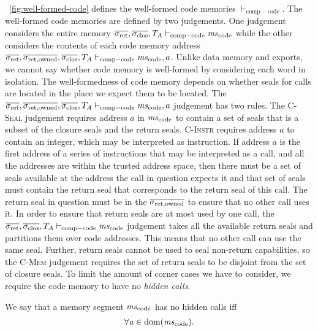 \documentclass[acmsmall,screen]{acmart}\settopmatter{}
\newenvironment{jversion}%
    {\color{OliveGreen}}{}
\begin{document}
\begin{jversion}
\figurename~\ref{fig:well-formed-code} defines the well-formed code memories $\vdash_{\mathrm{comp-code}}$.
The well-formed code memories are defined by two judgements.
One judgement considers the entire memory $\sigrets,\sigcloss,\ta\vdash_{\mathrm{comp-code}} \mscode$ while the other considers the contents of each code memory address $\sigrets,\sigrets[\mathrm{owned}],\sigcloss,\ta \vdash_{\mathrm{comp-code}} \mscode,a$.
Unlike data memory and exports, we cannot say whether code memory is well-formed by considering each word in isolation.
The well-formedness of code memory depends on whether seals for calls are located in the place we expect them to be located.
The $\sigrets,\sigrets[\mathrm{owned}],\sigcloss,\ta \vdash_{\mathrm{comp-code}} \mscode,a$ judgement has two rules.
The \textsc{C-Seal} judgement requires address $a$ in $\mscode$ to contain a set of seals that is a subset of the closure seals and the return seals.
\textsc{C-Instr} requires address $a$ to contain an integer, which may be interpreted as instruction.
If address $a$ is the first address of a series of instructions that may be interpreted as a call, and all the addresses are within the trusted address space, then there must be a set of seals available at the address the call in question expects it and that set of seals must contain the return seal that corresponds to the return seal of this call.
The return seal in question must be in the $\sigrets[\mathrm{owned}]$ to ensure that no other call uses it.
In order to ensure that return seals are at most used by one call, the $\sigrets,\sigcloss,\ta\vdash_{\mathrm{comp-code}} \mscode$ judgement takes all the available return seals and partitions them over code addresses. 
This means that no other call can use the same seal.
Further, return seals cannot be used to seal non-return capabilities, so the \textsc{C-Mem} judgement requires the set of return seals to be disjoint from the set of closure seals.
To limit the amount of corner cases we have to consider, we require the code memory to have no \textit{hidden calls}.
\begin{definition}
  \label{def:no-hidden-calls}
  We say that a memory segment $\mscode$ has no hidden calls iff
  \[
    \begin{array}{l}
      \forall \aaddr \in \dom(\mscode) \ldotp \\

\end{array}\]
\end{definition}
\end{jversion}
\end{document}
